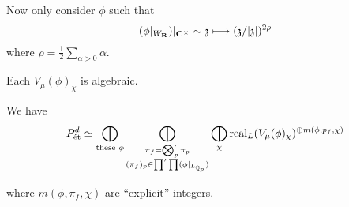 Now only consider $\phi$ such that
\[
(\phi|_{W_\R})|_{\C^{\times }} \sim \kz \mapsto (\kz / |\kz|)^{2\rho}
\]
where $\rho = \frac{1}{2}\sum_{\alpha > 0}\alpha$.
\begin{lemma}
Each $V_\mu(\phi)_\chi$ is algebraic.
\end{lemma}
\begin{conjecture}
We have
\[
	P^{d}_{\text{\'et}} \simeq \bigoplus_{\text{these }\phi}\bigoplus_{\substack{\pi_f =
	\bigotimes_p'\pi_p \\ (\pi_f)_p\in \prod'\prod(\phi|_{L_{\mathbb Q_p}})}}
	\bigoplus_{\chi}\operatorname{real}_L(V_\mu(\phi)_\chi)^{\oplus m(\phi,p_f,\chi)}
\]
\end{conjecture}
where $m(\phi,\pi_f,\chi)$ are ``explicit'' integers.


